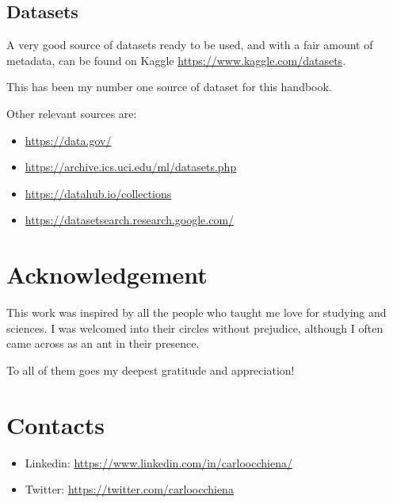 \documentclass{article}
\begin{document}
\subsection{Datasets}
A very good source of datasets ready to be used, and with a fair amount of metadata, can be found on Kaggle \url{https://www.kaggle.com/datasets}. 

This has been my number one source of dataset for this handbook.

Other relevant sources are:
\begin{itemize}
    \item \url{ https://data.gov/ }
    \item \url{https://archive.ics.uci.edu/ml/datasets.php }
    \item \url{https://datahub.io/collections }
    \item \url{https://datasetsearch.research.google.com/ }
\end{itemize}

\section{Acknowledgement}
This work was inspired by all the people who taught me love for studying and sciences. I was welcomed into their circles without prejudice, although I often came across as an ant in their presence.

To all of them goes my deepest gratitude and appreciation! 

\section{Contacts}
\begin{itemize}
    \item Linkedin: \url{https://www.linkedin.com/in/carloocchiena/} 
    \item Twitter: \url{https://twitter.com/carloocchiena} 
\end{itemize}
\end{document}
